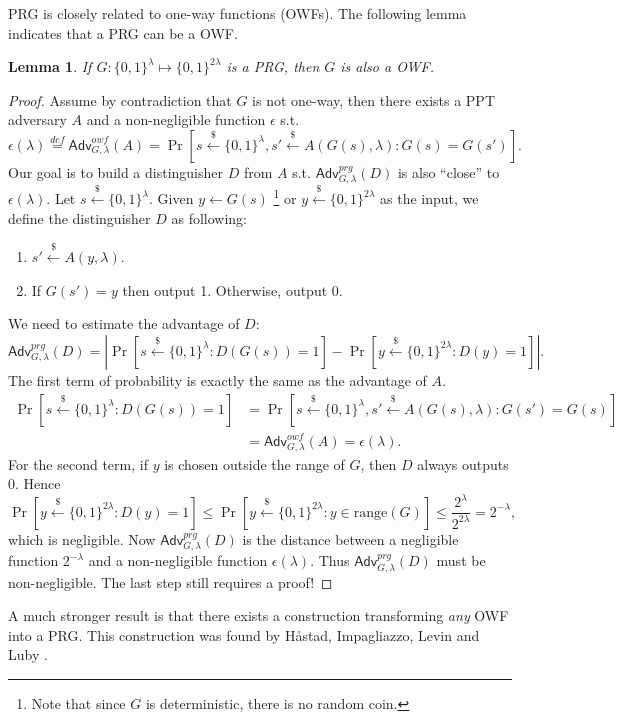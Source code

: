 \documentclass[12pt]{article}
\newcommand{\eqdef}{\stackrel{def}{=}}
\newcommand{\bits}{\{0,1\}}
\newcommand{\getsr}{\stackrel{\$}{\gets}}
\newcommand{\Adv}{\textsf{Adv}}
\newtheorem{lemma}[theorem]{Lemma}
\theoremstyle{definition}
\begin{document}
PRG is closely related to one-way functions (OWFs). The following lemma indicates that a PRG can be a OWF.
\begin{lemma}
If $G:\bits^\lambda \mapsto \bits^{2\lambda}$ is a PRG, then $G$ is also a OWF.
\end{lemma}
\begin{proof}
Assume by contradiction that $G$ is not one-way, then there exists a PPT adversary $A$ and a non-negligible function $\epsilon$ s.t.
$$\epsilon(\lambda) \eqdef \Adv_{G,\lambda}^{owf}(A) =\Pr[s\getsr\bits^\lambda, s'\getsr A(G(s),\lambda): G(s)=G(s')].$$
Our goal is to build a distinguisher $D$ from $A$ s.t. $\Adv_{G,\lambda}^{prg}(D)$ is also ``close'' to $\epsilon(\lambda)$.
Let $s\getsr\bits^\lambda$. Given $y\gets G(s)$ \footnote{Note that since $G$ is deterministic, there is no random coin.} or $y\getsr \bits^{2\lambda}$ as the input, we define the distinguisher $D$ as following:
\begin{enumerate}
\item $s' \getsr A(y, \lambda)$.
\item If $G(s') = y$ then output 1. Otherwise, output 0.
\end{enumerate}
We need to estimate the advantage of $D$:
$$\Adv_{G,\lambda}^{prg}(D) = \left| \Pr[s\getsr \bits^\lambda : D(G(s))=1] - \Pr[y\getsr\bits^{2\lambda} : D(y)=1] \right|.$$
The first term of probability is exactly the same as the advantage of $A$.
\[
\begin{aligned}
\Pr[s\getsr\bits^\lambda : D(G(s))=1] &= \Pr[s\getsr\bits^\lambda, s'\getsr A(G(s),\lambda): G(s') = G(s)] \\
&= \Adv_{G,\lambda}^{owf}(A) = \epsilon(\lambda).
\end{aligned}
\]
For the second term, if $y$ is chosen outside the range of $G$, then $D$ always outputs 0. Hence
\[
\Pr[y\getsr\bits^{2\lambda} : D(y)=1] \leq \Pr[y\getsr\bits^{2\lambda} : y\in\mathrm{range}(G)] 
\leq \frac{2^\lambda}{2^{2\lambda}} = 2^{-\lambda},
\]
which is negligible. Now $\Adv_{G,\lambda}^{prg}(D)$ is the distance between a negligible function $2^{-\lambda}$ and a non-negligible function $\epsilon(\lambda)$. Thus $\Adv_{G,\lambda}^{prg}(D)$ must be non-negligible. The last step still requires a proof!
\end{proof}

A much stronger result is that there exists a construction transforming \emph{any} OWF into a PRG. This construction was found by H\aa stad, Impagliazzo, Levin and Luby \cite{HILL99}.
\end{document}
